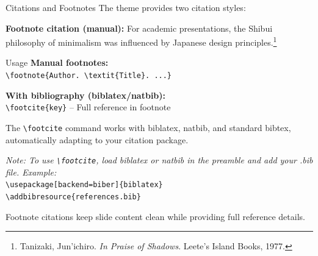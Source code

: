 \documentclass[aspectratio=169]{beamer}
\begin{document}
\begin{frame}{Citations and Footnotes}
  The theme provides two citation styles:

  \vspace{0.5em}

  \textbf{Footnote citation (manual):} For academic presentations, the Shibui philosophy of minimalism was influenced by Japanese design principles.\footnote{Tanizaki, Jun'ichiro. \textit{In Praise of Shadows}. Leete's Island Books, 1977. \vspace{1em}}

  \vspace{0.5em}

  \begin{shibuiframe}{Usage}
    \textbf{Manual footnotes:} \\
    \texttt{\textbackslash footnote\{Author. \textbackslash textit\{Title\}. ...\}}

    \vspace{0.3em}

    \textbf{With bibliography (biblatex/natbib):} \\
    \texttt{\textbackslash footcite\{key\}} -- Full reference in footnote

    \vspace{0.3em}

    The \texttt{\textbackslash footcite} command works with biblatex, natbib, and standard bibtex, automatically adapting to your citation package.

    \vspace{0.3em}

    \small\textit{Note: To use \texttt{\textbackslash footcite}, load biblatex or natbib in the preamble and add your .bib file. Example:} \\
    \texttt{\textbackslash usepackage[backend=biber]\{biblatex\}} \\
    \texttt{\textbackslash addbibresource\{references.bib\}}
  \end{shibuiframe}

  \vspace{0.3em}

  \small Footnote citations keep slide content clean while providing full reference details.
\end{frame}
\end{document}
